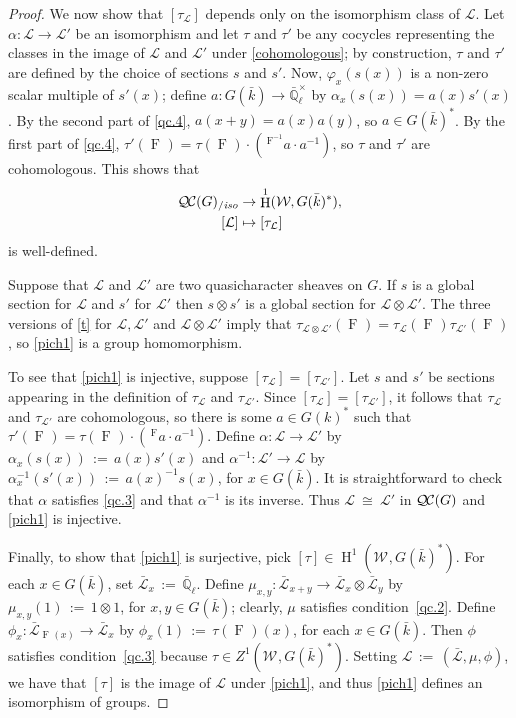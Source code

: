 \documentclass[11pt]{amsart}
\theoremstyle{plain}
\theoremstyle{definition}
\theoremstyle{remark}
\newcommand{\EE}{\mathbb{\bar Q}_\ell}
\newcommand{\bFq}{\bar{k}}
\newcommand{\Fq}{k}
\newcommand{\EEx}{\EE^\times}
\newcommand{\Frob}[1]{\operatorname{F}_{#1}}
\DeclareMathOperator{\Hh}{H}
\newcommand{\ceq}{{\, :=\, }}
\newcommand{\iso}{{\ \cong\ }}
\newcommand{\qcs}[1]{{\mathcal{#1}}}
\newcommand{\gqcs}[1]{{\mathcal{\bar #1}}}
\newcommand{\QC}{{\mathcal{Q\hskip-0.8pt C}}}
\newcommand{\QCiso}[1]{\QC(#1)_{/\textit{iso}}}
\newcommand{\Weil}[1]{\mathcal{W}_{#1}}
\newcommand\Clifton[1]{\marginpar{\smaller\smaller CC: #1}}
\begin{document}
\begin{proof}
  We now show that $[\tau_\qcs{L}]$ depends only on the isomorphism class of $\qcs{L}$.
  Let $\alpha : \qcs{L} \to \qcs{L'}$ be an isomorphism and
  let $\tau$ and $\tau'$ be any cocycles representing the classes in the
  image of $\qcs{L}$ and $\qcs{L'}$ under \eqref{cohomologous}; by construction,
  $\tau$ and $\tau'$ are defined by the choice of sections $s$ and $s'$.
  Now, $\varphi_x(s(x))$ is a
  non-zero scalar multiple of $s'(x)$; define $a: G(\bFq) \to \EEx$
  by $\alpha_x(s(x)) = a(x) s'(x)$.
  By the second part of \ref{qc.4},
  $a(x+y) = a(x)a(y)$, so $a \in G(\bFq)^*$. By the first part of
  \ref{qc.4}, 
  $\tau'(\Frob{}) = \tau(\Frob{}) \cdot (\,^{\Frob{}^{-1}}a \cdot a^{-1})$,
  so $\tau$ and $\tau'$ are cohomologous. This shows that
  \begin{equation}\label{pich1}
  \begin{split}
    \QCiso{G} &\to \Hh^1(\Weil{},G(\bFq)^*),\\
    [\qcs{L}] &\mapsto [\tau_\qcs{L}]
  \end{split}
  \end{equation}
  is well-defined.
  
    Suppose that $\qcs{L}$ and $\qcs{L}'$ are two quasicharacter sheaves on $G$.
  If $s$ is a global section for $\qcs{L}$ and $s'$ for $\qcs{L}'$ then $s \otimes s'$
  is a global section for $\qcs{L} \otimes\qcs{L}'$.  The three versions of \eqref{t}
  for $\qcs{L}, \qcs{L'}$ and $\qcs{L} \otimes\qcs{L}'$ imply that
  $\tau_{\qcs{L} \otimes\qcs{L}'}(\Frob{}) = \tau_\qcs{L}(\Frob{}) \tau_{\qcs{L}'}(\Frob{})$,
  so \eqref{pich1} is a group homomorphism.
 
 
 To see that \eqref{pich1} is injective,
 suppose $[\tau_\qcs{L}] = [\tau_\qcs{L'}]$.
 Let $s$ and $s'$ be sections appearing in the definition of $\tau_\qcs{L}$ and $\tau_\qcs{L'}$.
 Since $[\tau_\qcs{L}] = [\tau_\qcs{L'}]$, 
 it follows that $\tau_\qcs{L}$ and $\tau_{\qcs{L'}}$ are cohomologous, 
 so there is some $a\in G(\Fq)^*$ such that 
 $\tau'(\Frob{}) = \tau(\Frob{}) \cdot (\,^{\Frob{}}a \cdot a^{-1})$. 
 Define $\alpha : \qcs{L}\to \qcs{L'}$ by $\alpha_x(s(x)) \ceq a(x) s'(x)$ and $\alpha^{-1} : \qcs{L}'\to \qcs{L}$
 by $\alpha^{-1}_x(s'(x)) \ceq a(x)^{-1} s(x)$, for $x\in G(\bFq)$.
 It is straightforward to check that $\alpha$ satisfies \ref{qc.3}
 and that $\alpha^{-1}$ is its inverse. Thus $\qcs{L} \iso \qcs{L'}$ in $\QC(G)$ and \eqref{pich1} is injective.
  

 Finally, to show that \eqref{pich1} is surjective, pick $[\tau]\in \Hh^1(\Weil{}, G(\bFq)^*)$.
 For each $x\in G(\bFq)$, set $\gqcs{L}_x \ceq \EE$.
 Define $\mu_{x,y} : \gqcs{L}_{x+y} \to \gqcs{L}_x\otimes \gqcs{L}_y$ by
 $\mu_{x,y}(1) \ceq 1\otimes1$, for $x,y\in G(\bFq)$; 
 clearly, $\mu$ satisfies condition~\ref{qc.2}.
 Define $\phi_x : \gqcs{L}_{\Frob{}(x)} \to \gqcs{L}_x$ by $\phi_x(1) \ceq \tau(\Frob{})(x)$,
 for each $x\in G(\bFq)$. 
 Then $\phi$ satisfies condition~\ref{qc.3} because $\tau \in Z^1(\Weil{},G(\bFq)^*)$.
 Setting $\qcs{L} \ceq (\gqcs{L},\mu,\phi)$, we have that $[\tau]$ is the image of $\qcs{L}$
 under \eqref{pich1}, and thus \eqref{pich1} defines an isomorphism of groups.
\end{proof}
\end{document}
